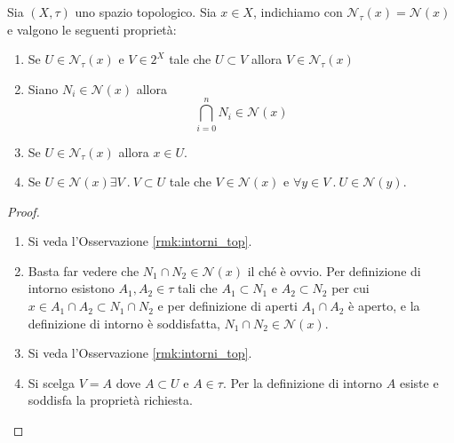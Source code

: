 \begin{proposition}
	Sia $(X,\tau)$ uno spazio topologico. Sia $x \in X$, indichiamo con $\mathcal{N}_\tau(x) = \mathcal{N}(x)$ e valgono le seguenti proprietà:
	\begin{enumerate}
		\item Se $U \in \mathcal{N}_\tau(x)$ e $V \in 2^X$ tale che $U \subset V$ allora $V \in \mathcal{N}_\tau(x)$
		\item Siano $N_i \in \mathcal{N}(x)$ allora 
		\begin{equation*}
			\bigcap^{n}_{i=0} N_i \in \mathcal{N}(x)
		\end{equation*}
		\item Se $U \in \mathcal{N}_\tau(x)$ allora $x \in U$. 
		\item Se $U \in \mathcal{N}(x) \exists V\ .\ V \subset U$ tale che $V \in \mathcal{N}(x)$ e $\forall y \in V\ .\ U \in \mathcal{N}(y)$.
	\end{enumerate}
\end{proposition}
\begin{proof}
	\begin{enumerate}
		\item Si veda l'Osservazione \ref{rmk:intorni_top}.
		\item Basta far vedere che $N_1 \cap N_2 \in \mathcal{N}(x)$ il ché è ovvio. Per definizione di intorno 
			esistono $A_1, A_2 \in \tau$ tali che $A_1 \subset N_1$ e $A_2 \subset N_2$ per cui $x \in A_1 \cap A_2 \subset N_1 \cap 
			N_2$ e per definizione di aperti $A_1 \cap A_2$ è aperto, e la definizione di intorno è soddisfatta, 
			$N_1 \cap N_2 \in \mathcal{N}(x)$.
		\item Si veda l'Osservazione \ref{rmk:intorni_top}.
		\item Si scelga $V = A$ dove $A \subset U$ e $A \in \tau$. Per la definizione di intorno $A$ esiste e soddisfa la proprietà richiesta. 
	\end{enumerate}
\end{proof}  

